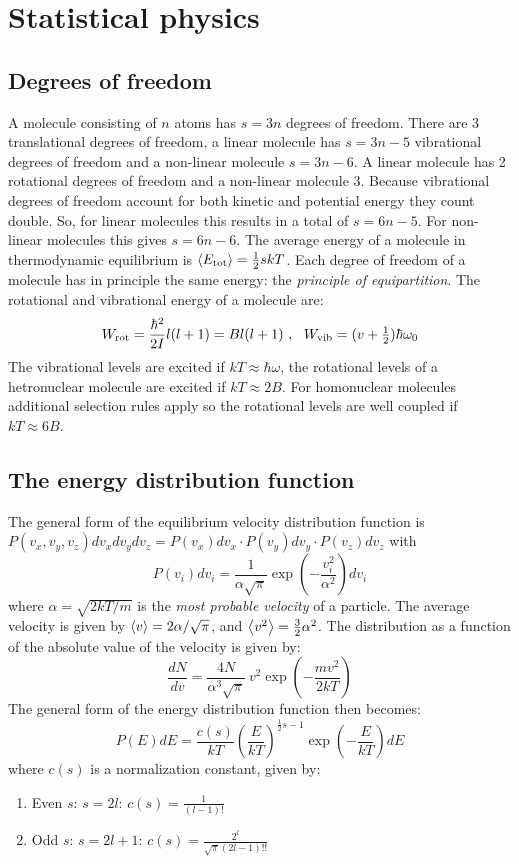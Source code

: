 \chapter{Statistical physics}
\section{Degrees of freedom}
A molecule consisting of $n$ atoms has $s=3n$ degrees of freedom. There are
3 translational degrees of freedom, a linear molecule has $s=3n-5$
vibrational degrees of freedom and a non-linear molecule $s=3n-6$. A linear
molecule has 2 rotational degrees of freedom and a non-linear molecule 3.
\npar
Because vibrational degrees of freedom account for both kinetic and potential
energy they count double. So, for linear molecules this results in a total of
$s=6n-5$. For non-linear molecules this gives $s=6n-6$. The average energy of
a molecule in thermodynamic equilibrium is $\left\langle E_{\rm tot} \right\rangle=\frac{1}{2}skT$.
Each degree of freedom of a molecule has in principle the same energy: the
{\it principle of equipartition}.
\npar
The rotational and vibrational energy of a molecule are:
\[
W_{\rm rot}=\frac{\hbar^2}{2I}l(l+1)=Bl(l+1)~,~~W_{\rm vib}=(v+\mbox{$\frac{1}{2}$})\hbar\omega_0
\]
The vibrational levels are excited if $kT\approx\hbar\omega$, the
rotational levels of a hetronuclear molecule are excited if $kT\approx2B$.
For homonuclear molecules additional selection rules apply so the rotational
levels are well coupled if $kT\approx6B$.

\section{The energy distribution function}
The general form of the equilibrium velocity distribution function is\\
$P(v_x,v_y,v_z)dv_xdv_ydv_z=P(v_x)dv_x\cdot P(v_y)dv_y\cdot P(v_z)dv_z$ with
\[
P(v_i)dv_i=\frac{1}{\alpha\sqrt{\pi}}\exp\left(-\frac{v_i^2}{\alpha^2}\right)dv_i
\]
where $\alpha=\sqrt{2kT/m}$ is the {\it most probable velocity} of a particle.
The average velocity is given by $\left\langle v \right\rangle=2\alpha/\sqrt{\pi}$, and
$\left\langle v^2 \right\rangle=\frac{3}{2}\alpha^2$. The distribution as a function of the
absolute value of the velocity is given by:
\[
\frac{dN}{dv}=\frac{4N}{\alpha^3\sqrt{\pi}}~v^2\exp\left(-\frac{mv^2}{2kT}\right)
\]
The general form of the energy distribution function then becomes:
\[
P(E)dE=\frac{c(s)}{kT}\left(\frac{E}{kT}\right)^{\frac{1}{2}s-1}\exp\left(-\frac{E}{kT}\right)dE
\]
where $c(s)$ is a normalization constant, given by:
\begin{enumerate}
\item Even $s$: $s=2l$: $\displaystyle c(s)=\frac{1}{(l-1)!}$
\item Odd $s$: $s=2l+1$: $\displaystyle c(s)=\frac{2^l}{\sqrt{\pi}(2l-1)!!}$
\end{enumerate}

